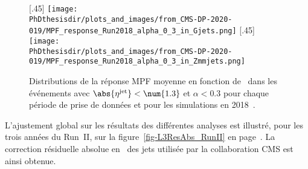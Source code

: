 \begin{figure}[h]
\centering
{}[.45\textwidth]
{\texttt{[image: \\PhDthesisdir/plots\_and\_images/from\_CMS-DP-2020-019/MPF\_response\_Run2018\_alpha\_0\_3\_in\_Gjets.png]}}
\hfill
{}[.45\textwidth]
{\texttt{[image: \\PhDthesisdir/plots\_and\_images/from\_CMS-DP-2020-019/MPF\_response\_Run2018\_alpha\_0\_3\_in\_Zmmjets.png]}}
\caption[Distributions de la réponse MPF moyenne en fonction de \pT\ en 2018.]{Distributions de la réponse MPF moyenne en fonction de \pT\ dans les événements avec $\abs{\eta^\text{jet}}<\num{1.3}$ et $\alpha<\num{0.3}$ pour chaque période de prise de données et pour les simulations en 2018~\cite{CMS-DP-2020-019}.}
\label{fig-chapter-JERC-section-JES-subsec-results-response_eta0013_alpha_0_3_2018}
\end{figure}
\par L'ajustement global sur les résultats des différentes analyses est illustré, pour les trois années du Run~II, sur la figure~\ref{fig-L3ResAbs_RunII} en page~\pageref{fig-L3ResAbs_RunII}.
La correction résiduelle absolue en \pT\ des jets utilisée par la collaboration CMS est ainsi obtenue.
